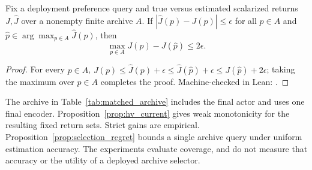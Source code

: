 \begin{proposition}
\label{prop:selection_regret}
Fix a deployment preference query and true versus estimated scalarized returns
$J, \widehat{J}$ over a nonempty finite archive $A$. If
$|\widehat{J}(p) - J(p)| \leq \epsilon$ for all $p \in A$ and
$\hat{p} \in \arg\max_{p \in A}\widehat{J}(p)$, then
\begin{equation}
 \max_{p \in A} J(p) - J(\hat{p}) \leq 2\epsilon.
\end{equation}
\end{proposition}
\begin{proof}
For every $p \in A$, $J(p) \leq \widehat{J}(p) + \epsilon \leq \widehat{J}(\hat{p}) + \epsilon \leq J(\hat{p}) + 2\epsilon$;
taking the maximum over $p \in A$ completes the proof. Machine-checked in Lean:
.
\end{proof}

The archive in Table~\ref{tab:matched_archive} includes the final actor and
uses one final encoder. Proposition~\ref{prop:hv_current} gives weak
monotonicity for the resulting fixed return sets. Strict gains are empirical.
Proposition~\ref{prop:selection_regret} bounds a single archive query under
uniform estimation accuracy. The experiments evaluate coverage, and do not
measure that accuracy or the utility of a deployed archive selector.
